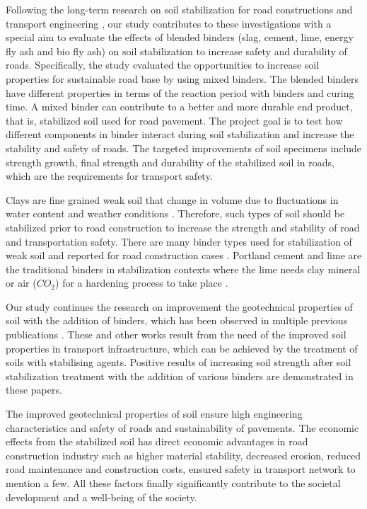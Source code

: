 \documentclass[constrmater,article,submit,pdftex,moreauthors]{Definitions/mdpi}
\begin{document}
Following the long-term research on soil stabilization for road constructions and transport engineering \citep{Bjerrum,Celauro,Glossop,Markwick,Nelson,Olsenetal2022,Sear}, our study contributes to these investigations with a special aim to evaluate the effects of blended binders (slag, cement, lime, energy fly ash and bio fly ash) on soil stabilization to increase safety and durability of roads. Specifically, the study evaluated the opportunities to increase soil properties for sustainable road base by using mixed binders. The blended binders have different properties in terms of the reaction period with binders and curing time. A mixed binder can contribute to a better and more durable end product, that is, stabilized soil used for road pavement. The project goal is to test how different components in binder interact during soil stabilization and increase the stability and safety of roads. The targeted improvements of soil specimens include strength growth, final strength and durability of the stabilized soil in roads, which are the requirements for transport safety.

Clays are fine grained weak soil that change in volume due to fluctuations in water content and weather conditions \cite{Sudhakar}. Therefore, such types of soil should be stabilized prior to road construction to increase the strength and stability of road and transportation safety. There are many binder types used for stabilization of weak soil and reported for road construction cases \citep{Antunes,Park}. Portland cement and lime are the traditional binders in stabilization contexts where the lime needs clay mineral or air ($CO_2$) for a hardening process to take place \citep{Bell,Hilt,LindhLemenkovaCEE,Taylor}. 

Our study continues the research on improvement the geotechnical properties of soil with the addition of binders, which has been observed in multiple previous publications \citep{Sorengard,AlSwaidani,Feng,LindhLemenkovaECES,Maheepala,Lindh2022NL,Nordmark}. These and other works result from the need of the improved soil properties in transport infrastructure, which can be achieved by the treatment of soils with stabilising agents. Positive results of increasing soil strength after soil stabilization treatment with the addition of various binders are demonstrated in these papers. 

The improved geotechnical properties of soil ensure high engineering characteristics and safety of roads and sustainability of pavements. The economic effects from the stabilized soil has direct economic advantages in road construction industry such as higher material stability, decreased erosion, reduced road maintenance and construction costs, ensured safety in transport network to mention a few. All these factors finally significantly contribute to the societal development and a well-being of the society.
\end{document}
